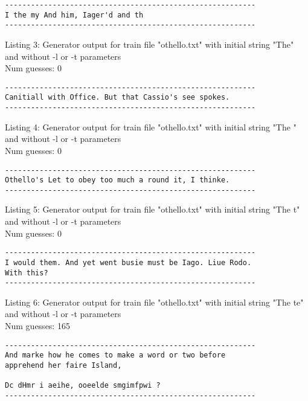 \documentclass{article}
\begin{document}
\begin{lstlisting}
----------------------------------------------------------
I the my And him, Iager'd and th
----------------------------------------------------------
\end{lstlisting}

Listing 3: Generator output for train file "othello.txt" with initial string "The" and without -l or -t parameters
\\Num guesses: 0

\begin{lstlisting}
----------------------------------------------------------
Canitiall with Office. But that Cassio's see spokes.
----------------------------------------------------------
\end{lstlisting}

Listing 4: Generator output for train file "othello.txt" with initial string "The " and without -l or -t parameters
\\Num guesses: 0

\begin{lstlisting}
----------------------------------------------------------
Othello's Let to obey too much a round it, I thinke.
----------------------------------------------------------
\end{lstlisting}

Listing 5: Generator output for train file "othello.txt" with initial string "The t" and without -l or -t parameters
\\Num guesses: 0

\begin{lstlisting}
----------------------------------------------------------
I would them. And yet went busie must be Iago. Liue Rodo. 
With this?
----------------------------------------------------------
\end{lstlisting}

Listing 6: Generator output for train file "othello.txt" with initial string "The te" and without -l or -t parameters
\\Num guesses: 165

\begin{lstlisting}
----------------------------------------------------------
And marke how he comes to make a word or two before 
apprehend her faire Island,

Dc dHmr i aeihe, ooeelde smgimfpwi ? 
----------------------------------------------------------
\end{lstlisting}
\end{document}
